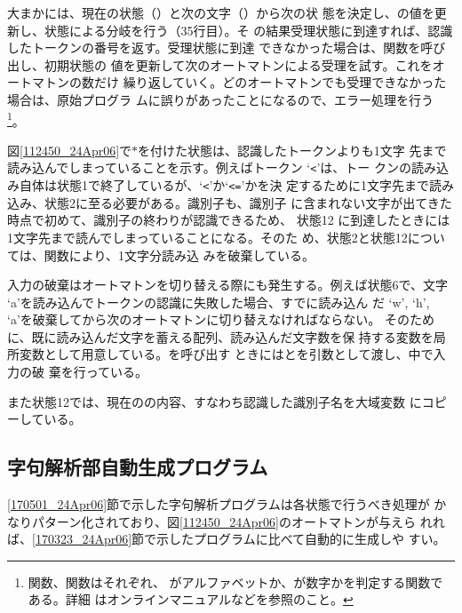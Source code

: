\begin{quote}
 
\end{quote}

大まかには、現在の状態（）と次の文字（）から次の状
態を決定し、の値を更新し、状態による分岐を行う（35行目）。そ
の結果受理状態に到達すれば、認識したトークンの番号を返す。受理状態に到達
できなかった場合は、関数を呼び出し、初期状態の
値を更新して次のオートマトンによる受理を試す。これをオートマトンの数だけ
繰り返していく。どのオートマトンでも受理できなかった場合は、原始プログラ
ムに誤りがあったことになるので、エラー処理を行う
\footnote{関数、関数はそれぞれ、
がアルファベットか、が数字かを判定する関数である。詳細
はオンラインマニュアルなどを参照のこと。}。

図\ref{112450_24Apr06}で$\ast$を付けた状態は、認識したトークンよりも1文字
先まで読み込んでしまっていることを示す。例えばトークン `\verb|<|'は、トー
クンの読み込み自体は状態1で終了しているが、`\verb|<|'か`\verb|<=|'かを決
定するために1文字先まで読み込み、状態2に至る必要がある。識別子も、識別子
に含まれない文字が出てきた時点で初めて、識別子の終わりが認識できるため、
状態12 に到達したときには1文字先まで読んでしまっていることになる。そのた
め、状態2と状態12については、関数により、1文字分読み込
みを破棄している。

入力の破棄はオートマトンを切り替える際にも発生する。例えば状態6で、文字
`a'を読み込んでトークンの認識に失敗した場合、すでに読み込ん
だ `w', `h', `a'を破棄してから次のオートマトンに切り替えなければならない。
そのために、既に読み込んだ文字を蓄える配列、読み込んだ文字数を保
持する変数を局所変数として用意している。を呼び出す
ときにはとを引数として渡し、中で入力の破
棄を行っている。

また状態12では、現在のの内容、すなわち認識した識別子名を大域変数
にコピーしている。

\subsection{字句解析部自動生成プログラム}

\ref{170501_24Apr06}節で示した字句解析プログラムは各状態で行うべき処理が
かなりパターン化されており、図\ref{112450_24Apr06}のオートマトンが与えら
れれば、\ref{170323_24Apr06}節で示したプログラムに比べて自動的に生成しや
すい。

